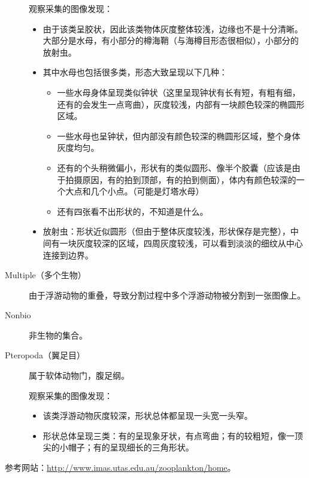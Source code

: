 \begin{description}
    观察采集的图像发现：
        \begin{itemize}
        \item 由于该类呈胶状，因此该类物体灰度整体较浅，边缘也不是十分清晰。大部分是水母，有小部分的樽海鞘（与海樽目形态很相似），小部分的放射虫。
        \item 其中水母也包括很多类，形态大致呈现以下几种：
            \begin{itemize}
            \item 一些水母身体呈现类似钟状（这里呈现钟状有长有短，有粗有细，还有的会发生一点弯曲），灰度较浅，内部有一块颜色较深的椭圆形区域。
            \item 一些水母也呈钟状，但内部没有颜色较深的椭圆形区域，整个身体灰度均匀。
            \item 还有的个头稍微偏小，形状有的类似圆形、像半个胶囊（应该是由于拍摄原因，有的拍到顶部，有的拍到侧面），体内有颜色较深的一个大点和几个小点。（可能是灯塔水母）
            \item 还有四张看不出形状的，不知道是什么。
            \end{itemize}
        \item 放射虫：形状近似圆形（但由于整体灰度较浅，形状保存是完整），中间有一块灰度较深的区域，四周灰度较浅，可以看到淡淡的细纹从中心连接到边界。
        \end{itemize}
    \item[{\color{blue}Multiple（多个生物）}] 由于浮游动物的重叠，导致分割过程中多个浮游动物被分割到一张图像上。
    \item[{\color{blue}Nonbio}] 非生物的集合。
    \item[Pteropoda（翼足目）] 属于软体动物门，腹足纲。
    
    观察采集的图像发现：
    \begin{itemize}
    \item 该类浮游动物灰度较深，形状总体都呈现一头宽一头窄。
    \item 形状总体呈现三类：有的呈现象牙状，有点弯曲；有的较粗短，像一顶尖的小帽子；有的呈现细长的三角形状。
    \end{itemize}
\end{description}

参考网站：\url{http://www.imas.utas.edu.au/zooplankton/home}。
